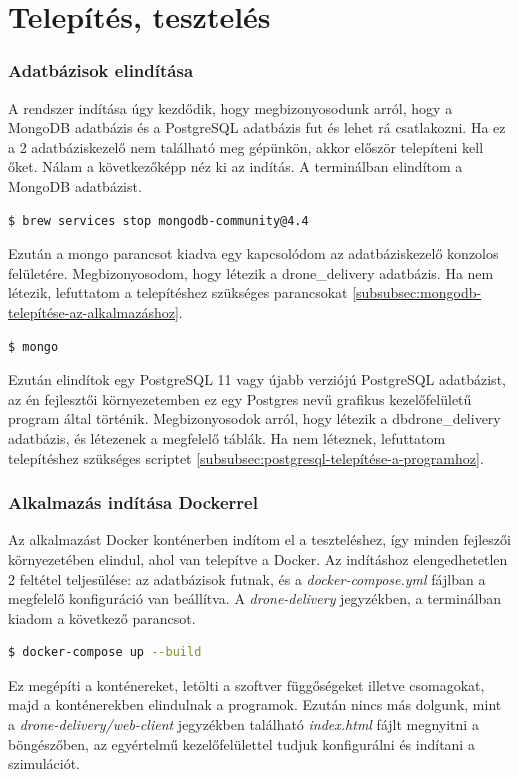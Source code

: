 \section{Telepítés, tesztelés}
\subsubsection{Adatbázisok elindítása}
A rendszer indítása úgy kezdődik, hogy megbizonyosodunk arról, hogy a MongoDB adatbázis és a PostgreSQL adatbázis fut és lehet rá csatlakozni.
Ha ez a 2 adatbáziskezelő nem található meg gépünkön, akkor először telepíteni kell őket.
Nálam a következőképp néz ki az indítás. A terminálban elindítom a MongoDB adatbázist.
\begin{lstlisting}[language=bash]
  $ brew services stop mongodb-community@4.4
\end{lstlisting}

Ezután a mongo parancsot kiadva egy kapcsolódom az adatbáziskezelő konzolos felületére.
Megbizonyosodom, hogy létezik a drone\_delivery adatbázis.
Ha nem létezik, lefuttatom a telepítéshez szükséges parancsokat \ref{subsubsec:mongodb-telepítése-az-alkalmazáshoz}.
\begin{lstlisting}[language=bash]
  $ mongo
\end{lstlisting}


Ezután elindítok egy PostgreSQL 11 vagy újabb verziójú PostgreSQL adatbázist, az én fejlesztői környezetemben ez egy Postgres nevű grafikus kezelőfelületű program által történik.
Megbizonyosodok arról, hogy létezik a dbdrone\_delivery adatbázis, és létezenek a megfelelő táblák. Ha nem léteznek, lefuttatom telepítéshez szükséges scriptet \ref{subsubsec:postgresql-telepítése-a-programhoz}.

\subsubsection{Alkalmazás indítása Dockerrel}
Az alkalmazást Docker konténerben indítom el a teszteléshez, így minden fejleszői környezetében elindul, ahol van telepítve a Docker.
Az indításhoz elengedhetetlen 2 feltétel teljesülése: az adatbázisok futnak, és a \textit{docker-compose.yml} fájlban a megfelelő konfiguráció van beállítva.
A \textit{drone-delivery} jegyzékben, a terminálban kiadom a következő parancsot.
\begin{lstlisting}[language=bash]
  $ docker-compose up --build
\end{lstlisting}

Ez megépíti a konténereket, letölti a szoftver függőségeket illetve csomagokat, majd a konténerekben elindulnak a programok.
Ezután nincs más dolgunk, mint a \textit{drone-delivery/web-client} jegyzékben található \textit{index.html} fájlt megnyitni a böngészőben, az egyértelmű kezelőfelülettel tudjuk konfigurálni és indítani a szimulációt.

